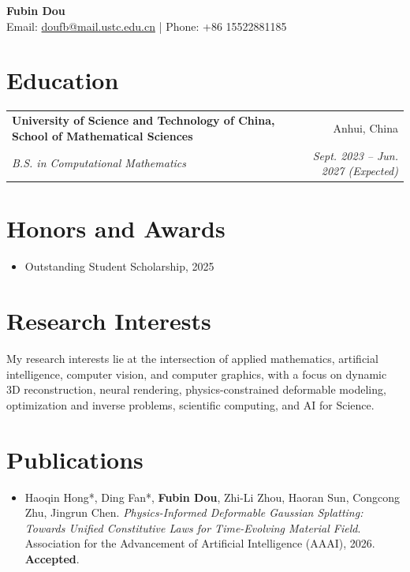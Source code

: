 \documentclass[10.5pt,a4paper]{article}
\makeatletter
\newcommand{\resumeSubheading}[4]{%
  \begin{tabularx}{\textwidth}{@{}X r@{}}
    \textbf{#1} & #2 \\
    \textit{#3} & \textit{#4} \\
  \end{tabularx}\vspace{-0.15em}
}
\newcommand{\resumeParagraph}[1]{%
  {\setlength{\parskip}{0pt}\linespread{1.08}\selectfont #1\par}\vspace{0.10em}
}
\makeatother
\begin{document}
\begin{center}
    {\LARGE \textbf{Fubin Dou}} \\
    \vspace{0.25em}
    Email: \href{mailto:doufb@mail.ustc.edu.cn}{doufb@mail.ustc.edu.cn}
    \quad | \quad
    Phone: +86 15522881185
\end{center}
\vspace{-0.6em}

\section{Education}
\resumeSubheading
{University of Science and Technology of China, School of Mathematical Sciences}{Anhui, China}
{B.S. in Computational Mathematics}{Sept. 2023 -- Jun. 2027 (Expected)}

\section{Honors and Awards}
\begin{itemize}
    \item Outstanding Student Scholarship, 2025
\end{itemize}

\section{Research Interests}
\resumeParagraph{My research interests lie at the intersection of applied mathematics, artificial intelligence, computer vision, and computer graphics, with a focus on dynamic 3D reconstruction, neural rendering, physics-constrained deformable modeling, optimization and inverse problems, scientific computing, and AI for Science.}

\section{Publications}
\begin{itemize}
    \item Haoqin Hong*, Ding Fan*, \textbf{Fubin Dou}, Zhi-Li Zhou, Haoran Sun, Congcong Zhu, Jingrun Chen.
    \textit{Physics-Informed Deformable Gaussian Splatting: Towards Unified Constitutive Laws for Time-Evolving Material Field}.
    Association for the Advancement of Artificial Intelligence (AAAI), 2026. \textbf{Accepted}.
\end{itemize}
\end{document}
